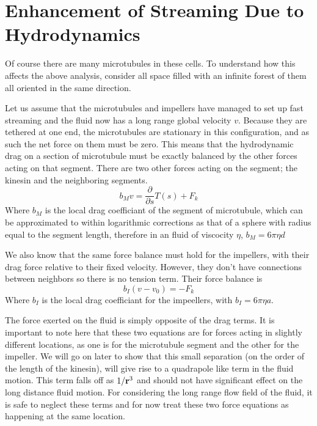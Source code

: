 \documentclass[11pt]{ucthesis}
\def\br{{\bf r}}
\begin{document}
\section{Enhancement of Streaming Due to Hydrodynamics} 

Of course there are  many microtubules in these cells. To understand how this
affects the above analysis, consider all space filled with an infinite forest of them all oriented
in the same direction. 

Let us assume that the microtubules and impellers have managed to set up fast streaming and the fluid now has a long range global velocity $v$.
Because they are tethered at one end, the microtubules are stationary in this configuration, and as such the net force on them must be zero. 
This means that the hydrodynamic drag on a section of microtubule must be exactly balanced by the other forces acting on that segment.
There are two other forces acting on the segment; the kinesin and the neighboring segments.
\begin{equation}
\label{eq:mfnetMforce}
b_M v = \frac{\partial}{\partial s}T(s) + F_k
\end{equation}
Where $b_M$ is the local drag coefficiant of the segment of microtubule, which can be approximated to within logarithmic corrections as that of a sphere with radius equal to the segment length, therefore in an fluid of viscocity $\eta$, $b_M = 6\pi \eta d$

We also know that the same force balance must hold for the impellers, with their drag force relative to their fixed velocity. 
However, they don't have connections between neighbors so there is no tension term. 
Their force balance is 
\begin{equation}
\label{eq:mfnetIforce}
b_I (v - v_0) =  -F_k
\end{equation}
Where $b_I$ is the local drag coefficiant for the impeellers, with $b_I = 6\pi\eta a$.

The force exerted on the fluid is simply opposite of the drag terms. It is important to note here that these two equations are for forces acting in slightly different locations, as one is for the microtubule segment and the other for the impeller. 
We will go on later to show that this small separation (on the order of the length of the kinesin), will give rise to a quadrapole like term in the fluid motion.
This term falls off as $1/\br^3$ and should not have significant effect on the long distance fluid motion.
For considering the long range flow field of the fluid, it is safe to neglect these terms and for now treat these two force equations as happening at the same location.
\end{document}
